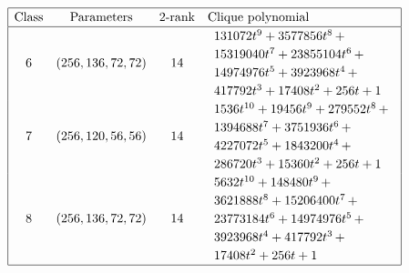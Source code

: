 \documentclass[12pt,a4paper]{article}
\begin{document}
\newpage
\small{}
\begin{align*}
\def\arraystretch{1.2}
\begin{array}{|cccl|}
\hline
\text{Class} &
\text{Parameters} &
\text{2-rank} &
\text{Clique polynomial}
\\
\hline
6 &
(256, 136, 72, 72) &
14 &
\begin{array}{l}
131072t^{9} + 3577856t^{8}
\,+
\\
 15319040t^{7} + 23855104t^{6}
\,+
\\
 14974976t^{5} + 3923968t^{4}
\,+
\\
 417792t^{3} + 17408t^{2} + 256t + 1
\end{array}
\\
7 &
(256, 120, 56, 56) &
14 &
\begin{array}{l}
1536t^{10} + 19456t^{9} + 279552t^{8}
\,+
\\
 1394688t^{7} + 3751936t^{6}
\,+
\\
 4227072t^{5} + 1843200t^{4}
\,+
\\
 286720t^{3} + 15360t^{2} + 256t + 1
\end{array}
\\
8 &
(256, 136, 72, 72) &
14 &
\begin{array}{l}
5632t^{10} + 148480t^{9}
\,+
\\
 3621888t^{8} + 15206400t^{7}
\,+
\\
 23773184t^{6} + 14974976t^{5}
\,+
\\
 3923968t^{4} + 417792t^{3}
\,+
\\
 17408t^{2} + 256t + 1
\end{array}
\\
\hline
\end{array}
\end{align*}
\end{document}

